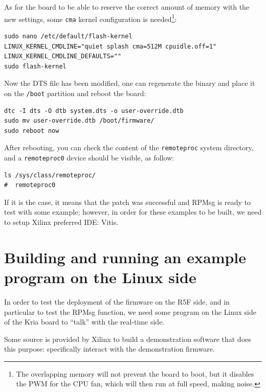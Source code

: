 \documentclass[10pt]{article}
\begin{document}
As for the board to be able to reserve the correct amount of memory with the new settings, some
\verb|cma| kernel configuration is needed\footnote{The overlapping memory will not prevent the board to boot,
  but it disables the PWM for the CPU fan, which will then run at full speed, making noise.}:
\begin{tcolorbox}
\begin{verbatim}
sudo nano /etc/default/flash-kernel
LINUX_KERNEL_CMDLINE="quiet splash cma=512M cpuidle.off=1"
LINUX_KERNEL_CMDLINE_DEFAULTS=""
sudo flash-kernel
\end{verbatim}
\end{tcolorbox}

Now the DTS file has been modified, one can regenerate the binary and place it on the \verb|/boot| partition
and reboot the board:
\begin{tcolorbox}
\begin{verbatim}
dtc -I dts -O dtb system.dts -o user-override.dtb
sudo mv user-override.dtb /boot/firmware/
sudo reboot now
\end{verbatim}
\end{tcolorbox}

After rebooting, you can check the content of the \verb|remoteproc| system directory,
and a \verb|remoteproc0| device should be visible, as follow:
\begin{tcolorbox}
\begin{verbatim}
ls /sys/class/remoteproc/
#  remoteproc0
\end{verbatim}
\end{tcolorbox}

If it is the case, it means that the patch was successful and RPMsg is
ready to test with some example; however, in order for these examples
to be built, we need to setup Xilinx preferred IDE: Vitis.


\section{Building and running an example program on the Linux side}
\label{sec:building-running-an}
In order to test the deployment of the firmware on the R5F side, and in particular
to test the RPMsg function, we need some program on the Linux side of the Kria
board to ``talk'' with the real-time side.

Some source is provided by Xilinx to build a demonstration software that does
this purpose: specifically interact with the demonstration firmware.
\end{document}

